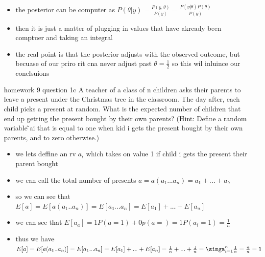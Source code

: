 \documentclass[10pt]{article}
\begin{document}
\begin{itemize}
    \item the posterior can be computer as $P(\theta|y)=\frac{P(y,\theta)}{P(y)}=\frac{P(y|\theta)P(\theta)}{P(y)}$
    \item then it is just a matter of plugging in values that have akready been comptuer and taking an integral 
    \item the real point is that the posterior adjusts with the observed outcome, but becuase of our priro rit cna never adjust past $\theta=\frac{1}{2}$ so this wil inluince our conclsuions 
\end{itemize}
homework 9 question 1c  A teacher of a class of n children asks their parents to leave a present under the
Christmas tree in the classroom. The day after, each child picks a present at random.
What is the expected number of children that end up getting the present bought by
their own parents? (Hint: Define a random variable  ̃ai that is equal to one when kid
i gets the present bought by their own parents, and to zero otherwise.)
\begin{itemize}
\item we lets deffine an rv $a_i$ which takes on value 1 if child i gets the present their parent bought 
\item we can call the total number of presents $a=a(a_1...a_n)=a_1+...+a_b$
\item so we can see that $E[a]=E[a(a_1..a_n)]=E[a_1...a_n]=E[a_1]+...+E[a_n]$
\item we can see that $E[a_a]=1P(a=1)+0p(a=)=1P(a_i=1)=\frac{1}{n}$
\item thus we have $E[a]=E[a(a_1..a_n)]=E[a_1...a_n]=E[a_1]+...+E[a_n]=\frac{1}{n}+...+\frac{1}{n}=\simga_{i=1}^{n}\frac{1}{n}=\frac{n}{n}=1$
\end{itemize}
\end{document}
